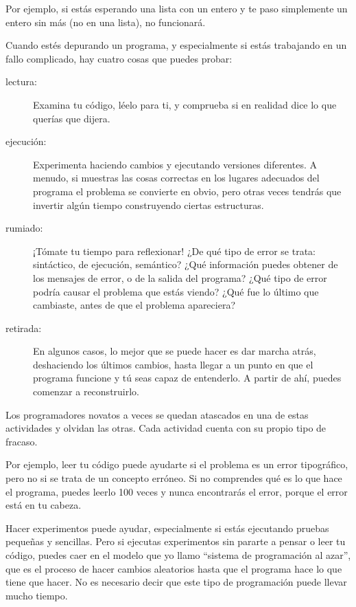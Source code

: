 Por ejemplo, si estás esperando una lista con un entero y te
paso simplemente un entero sin más (no en una lista), no funcionará.

Cuando estés depurando un programa, y especialmente si estás
trabajando en un fallo complicado, hay cuatro cosas que puedes probar:

\begin{description}

\item[lectura:] Examina tu código, léelo para ti, y comprueba
si en realidad dice lo que querías que dijera.

\item[ejecución:] Experimenta haciendo cambios y ejecutando versiones
diferentes. A menudo, si muestras las cosas correctas en los lugares
adecuados del programa el problema se convierte en obvio, pero otras veces
tendrás que invertir algún tiempo construyendo ciertas estructuras.

\item[rumiado:] ¡Tómate tu tiempo para reflexionar! ¿De qué tipo de error
se trata: sintáctico, de ejecución, semántico? ¿Qué información puedes obtener de
los mensajes de error, o de la salida del programa? ¿Qué tipo de
error podría causar el problema que estás viendo? ¿Qué fue lo último
que cambiaste, antes de que el problema apareciera?

\item[retirada:] En algunos casos, lo mejor que se puede hacer
es dar marcha atrás, deshaciendo los últimos cambios, hasta llegar
a un punto en que el programa funcione y tú seas capaz de entenderlo. A partir de ahí,
puedes comenzar a reconstruirlo.

\end{description}

Los programadores novatos a veces se quedan atascados en una de estas actividades
y olvidan las otras. Cada actividad cuenta con su propio tipo
de fracaso.


Por ejemplo, leer tu código puede ayudarte si el problema es un
error tipográfico, pero no si se trata de un concepto
erróneo. Si no comprendes qué es lo que hace el programa, puedes
leerlo 100 veces y nunca encontrarás el error, porque el error está en
tu cabeza.


Hacer experimentos puede ayudar, especialmente si estás ejecutando
pruebas pequeñas y sencillas. Pero si ejecutas experimentos sin pararte a pensar
o leer tu código, puedes caer en el modelo que yo llamo ``sistema de programación al azar'',
que es el proceso de hacer cambios aleatorios hasta que el programa
hace lo que tiene que hacer. No es necesario decir que este tipo de programación
puede llevar mucho tiempo.

